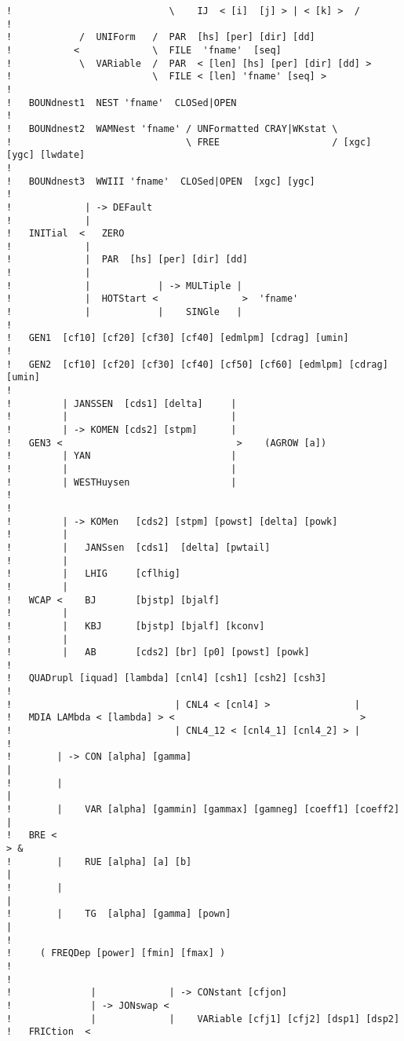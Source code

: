 \documentclass[12pt]{book}
\begin{document}
\begin{verbatim}
!                            \    IJ  < [i]  [j] > | < [k] >  /
!
!            /  UNIForm   /  PAR  [hs] [per] [dir] [dd]
!           <             \  FILE  'fname'  [seq]
!            \  VARiable  /  PAR  < [len] [hs] [per] [dir] [dd] >
!                         \  FILE < [len] 'fname' [seq] >
!
!   BOUNdnest1  NEST 'fname'  CLOSed|OPEN
!
!   BOUNdnest2  WAMNest 'fname' / UNFormatted CRAY|WKstat \
!                               \ FREE                    / [xgc] [ygc] [lwdate]
!
!   BOUNdnest3  WWIII 'fname'  CLOSed|OPEN  [xgc] [ygc]
!
!             | -> DEFault
!             |
!   INITial  <   ZERO
!             |
!             |  PAR  [hs] [per] [dir] [dd]
!             |
!             |            | -> MULTiple |
!             |  HOTStart <               >  'fname'
!             |            |    SINGle   |
!
!   GEN1  [cf10] [cf20] [cf30] [cf40] [edmlpm] [cdrag] [umin]
!
!   GEN2  [cf10] [cf20] [cf30] [cf40] [cf50] [cf60] [edmlpm] [cdrag] [umin]
!
!         | JANSSEN  [cds1] [delta]     |
!         |                             |
!         | -> KOMEN [cds2] [stpm]      |
!   GEN3 <                               >    (AGROW [a])
!         | YAN                         |
!         |                             |
!         | WESTHuysen                  |
!
!
!         | -> KOMen   [cds2] [stpm] [powst] [delta] [powk]
!         |
!         |   JANSsen  [cds1]  [delta] [pwtail]
!         |
!         |   LHIG     [cflhig]
!         |
!   WCAP <    BJ       [bjstp] [bjalf]
!         |
!         |   KBJ      [bjstp] [bjalf] [kconv]
!         |
!         |   AB       [cds2] [br] [p0] [powst] [powk]
!
!   QUADrupl [iquad] [lambda] [cnl4] [csh1] [csh2] [csh3]
!
!                             | CNL4 < [cnl4] >               |
!   MDIA LAMbda < [lambda] > <                                 >
!                             | CNL4_12 < [cnl4_1] [cnl4_2] > |
!
!        | -> CON [alpha] [gamma]                                      |
!        |                                                             |
!        |    VAR [alpha] [gammin] [gammax] [gamneg] [coeff1] [coeff2] |
!   BRE <                                                               > &
!        |    RUE [alpha] [a] [b]                                      |
!        |                                                             |
!        |    TG  [alpha] [gamma] [pown]                               |
!
!     ( FREQDep [power] [fmin] [fmax] )
!
!
!              |             | -> CONstant [cfjon]
!              | -> JONswap <
!              |             |    VARiable [cfj1] [cfj2] [dsp1] [dsp2]
!   FRICtion  <

\end{verbatim}
\end{document}
